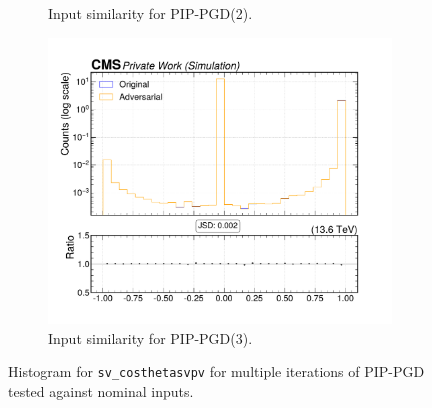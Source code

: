 \begin{figure}[htbp]
\begin{subfigure}[t]{0.32\textwidth}
    \caption*{Input similarity for PIP-PGD(2).}
  \end{subfigure}\hfill
  \begin{subfigure}[t]{0.32\textwidth}
    \includegraphics[width=\linewidth]{media/output/features/compare/combined_it_3/cmp_vtx_arr_sv_costhetasvpv.pdf}
    \caption*{Input similarity for PIP-PGD(3).}
  \end{subfigure}

  \caption*{Histogram for \texttt{sv\_costhetasvpv} for multiple iterations of PIP-PGD tested against nominal inputs.}
  \label{fig:combined_input_sv_costhetasvpv}
\end{figure}

